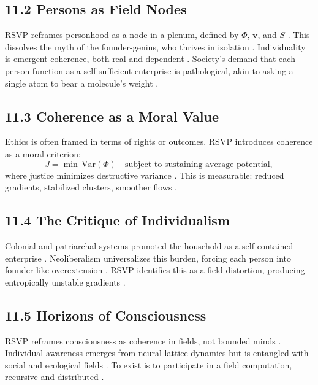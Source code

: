 \documentclass[12pt]{article}
\begin{document}
{{\subsection*{11.2 Persons as Field Nodes}

RSVP reframes personhood as a node in a plenum, defined by \(\Phi\), \(\mathbf{v}\), and \(S\) \citep{gromov1999}. This dissolves the myth of the founder-genius, who thrives in isolation \citep{zuboff2019}. Individuality is emergent coherence, both real and dependent \citep{whitehead1978}. Society’s demand that each person function as a self-sufficient enterprise is pathological, akin to asking a single atom to bear a molecule’s weight \citep{deleuze1987}.

\subsection*{11.3 Coherence as a Moral Value}

Ethics is often framed in terms of rights or outcomes. RSVP introduces coherence as a moral criterion:
\[
J = \min \, \mathrm{Var}(\Phi) \quad \text{subject to sustaining average potential},
\]
where justice minimizes destructive variance \citep{whitehead1978}. This is measurable: reduced gradients, stabilized clusters, smoother flows \citep{gromov1999}.

\subsection*{11.4 The Critique of Individualism}

Colonial and patriarchal systems promoted the household as a self-contained enterprise \citep{ortega1957}. Neoliberalism universalizes this burden, forcing each person into founder-like overextension \citep{zuboff2019}. RSVP identifies this as a field distortion, producing entropically unstable gradients \citep{shannon1948}.

\subsection*{11.5 Horizons of Consciousness}

RSVP reframes consciousness as coherence in fields, not bounded minds \citep{tononi2004}. Individual awareness emerges from neural lattice dynamics but is entangled with social and ecological fields \citep{hohwy2013}. To exist is to participate in a field computation, recursive and distributed \citep{whitehead1978}.

}}
\end{document}
